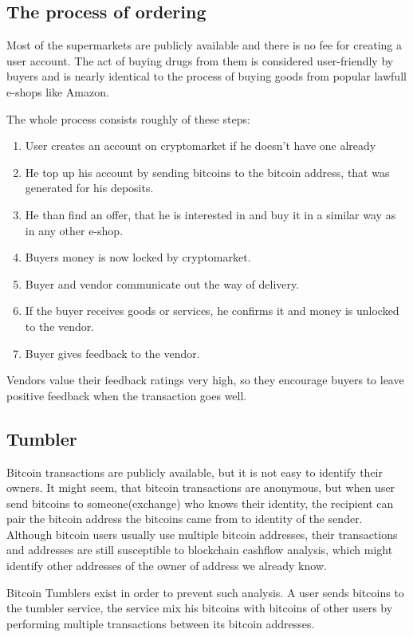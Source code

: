 \documentclass[
  digital, %
  table,   %
  lof,     %
  lot,     %
  oneside
]{fithesis3}
\begin{document}
\subsection{The process of ordering}
Most of the supermarkets are publicly available and there is no fee
for creating a user account. The act of buying drugs from them is considered user-friendly by buyers and is nearly identical to the process of buying goods from popular lawfull e-shops like Amazon.

 The whole process consists roughly of these steps:
\begin{enumerate}
\item User creates an account on cryptomarket if he doesn't have one already
\item He top up his account by sending bitcoins to the bitcoin address,
that was generated for his deposits.
\item He than find an offer, that he is interested in and buy it in a similar
way as in any other e-shop.
\item Buyers money is now locked by cryptomarket.
\item Buyer and vendor communicate out the way of delivery.
\item If the buyer receives goods or services, he confirms it and money is unlocked to the vendor.
\item Buyer gives feedback to the vendor. 
\end{enumerate}

Vendors value their feedback ratings very high, so they encourage buyers to leave
 positive feedback when the transaction goes well.
 
\subsection{Tumbler}
Bitcoin transactions are publicly available, but it is not easy to identify their owners.
It might seem, that bitcoin transactions are anonymous, but when user send bitcoins to
someone(exchange) who knows their identity, the recipient can pair the bitcoin address
the bitcoins came from to identity of the sender.
Although bitcoin users usually use multiple bitcoin addresses,
their transactions and addresses are still 
susceptible to blockchain cashflow analysis,
which might identify other addresses of the owner of address we already know.

Bitcoin Tumblers exist in order to prevent such analysis.
A user sends bitcoins to the tumbler service, the service mix his bitcoins
with bitcoins of other users by performing multiple transactions
between its bitcoin addresses. \parencite{moser2013inquiry}
  
\end{document}
